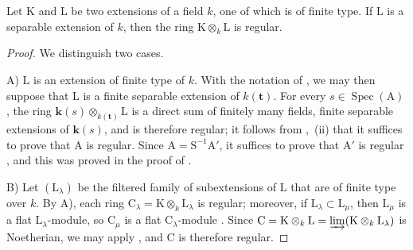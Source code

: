 \begin{lemma}[6.7.4.1]
\label{IV.6.7.4.1}
Let $\mathrm{K}$ and $\mathrm{L}$ be two extensions of a field $k$, one of which is of finite type. If $\mathrm{L}$ is a separable extension of $k$, then the ring $\mathrm{K}\otimes_k\mathrm{L}$ is regular.
\end{lemma}

\begin{proof}
We distinguish two cases.

A) $\mathrm{L}$ is an extension of finite type of $k$. With the notation of , we may then suppose that $\mathrm{L}$ is a finite separable extension of $k(\mathbf{t})$. For every $s\in\operatorname{Spec}(\mathrm{A})$, the ring $\boldsymbol{k}(s)\otimes_{k(\mathbf{t})}\mathrm{L}$ is a direct sum of finitely many fields, finite separable extensions of $\boldsymbol{k}(s)$, and is therefore regular; it follows from ,~(ii) that it suffices to prove that $\mathrm{A}$ is regular. Since $\mathrm{A}=\mathrm{S}^{-1}\mathrm{A}'$, it suffices to prove that $\mathrm{A}'$ is regular , and this was proved in the proof of .

B) Let $(\mathrm{L}_\lambda)$ be the filtered family of subextensions of $\mathrm{L}$ that are of finite type over $k$. By A), each ring $\mathrm{C}_\lambda=\mathrm{K}\otimes_k\mathrm{L}_\lambda$ is regular; moreover, if $\mathrm{L}_\lambda\subset\mathrm{L}_\mu$, then $\mathrm{L}_\mu$ is a flat $\mathrm{L}_\lambda$-module, so $\mathrm{C}_\mu$ is a flat $\mathrm{C}_\lambda$-module . Since $\mathrm{C}=\mathrm{K}\otimes_k\mathrm{L}=\varinjlim(\mathrm{K}\otimes_k\mathrm{L}_\lambda)$ is Noetherian, we may apply , and $\mathrm{C}$ is therefore regular.
\end{proof}


